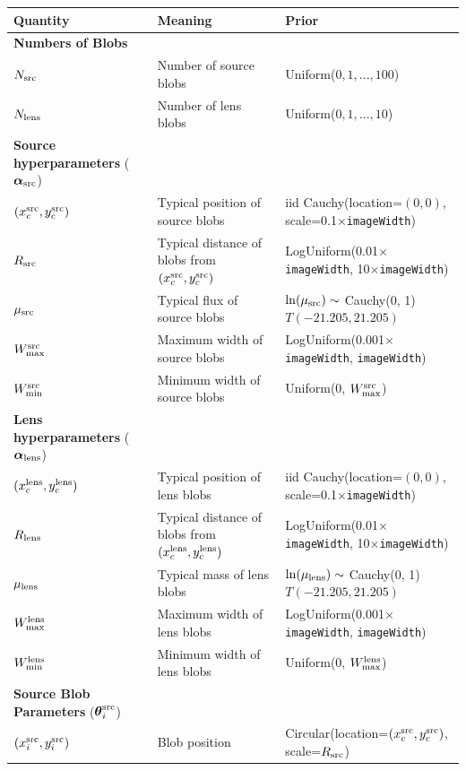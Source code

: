 \documentclass[useAMS,usenatbib]{mn2e}
\begin{document}
\begin{table}
\begin{tabular}{|l|l|l|}
\hline
Quantity	&	Meaning		& Prior\\
\hline
{\bf Numbers of Blobs}\\
\hline
$N_{\rm src}$	&	Number of source blobs	& Uniform($0, 1, ..., 100$)\\
$N_{\rm lens}$	&	Number of lens blobs	& Uniform($0, 1, ..., 10$)\\
\hline
{\bf Source hyperparameters} ($\boldsymbol{\alpha}_{\rm src}$)\\
\hline
$(x_c^{\rm src}, y_c^{\rm src})$ & Typical position of source blobs & iid Cauchy(location=$(0,0)$, scale=0.1$\times${\tt imageWidth})\\
$R_{\rm src}$   &	Typical distance of blobs from $(x_c^{\rm src}, y_c^{\rm src})$ & LogUniform(0.01$\times${\tt imageWidth}, 10$\times${\tt imageWidth})\\
$\mu_{\rm src}$ &	Typical flux of source blobs	& $\ln(\mu_{\rm src}) \sim$ Cauchy(0, 1)$T(-21.205, 21.205)$\\
$W_{\rm max}^{\rm src}$ &		Maximum width of source blobs	& LogUniform(0.001$\times${\tt imageWidth}, {\tt imageWidth})\\
$W_{\rm min}^{\rm src}$ &		Minimum width of source blobs	& Uniform(0, $W_{\rm max}^{\rm src}$)\\
\hline
{\bf Lens hyperparameters} ($\boldsymbol{\alpha}_{\rm lens}$)\\
\hline
$(x_c^{\rm lens}, y_c^{\rm lens})$ & Typical position of lens blobs & iid Cauchy(location=$(0,0)$, scale=0.1$\times${\tt imageWidth})\\
$R_{\rm lens}$  &	Typical distance of blobs from $(x_c^{\rm lens}, y_c^{\rm lens})$ 	& LogUniform(0.01$\times${\tt imageWidth}, 10$\times${\tt imageWidth})\\
$\mu_{\rm lens}$&	Typical mass of lens blobs	& $\ln(\mu_{\rm lens}) \sim$ Cauchy(0, 1)$T(-21.205, 21.205)$\\
$W_{\rm max}^{\rm lens}$ &		Maximum width of lens blobs	& LogUniform(0.001$\times${\tt imageWidth}, {\tt imageWidth})\\
$W_{\rm min}^{\rm lens}$ &		Minimum width of lens blobs	& Uniform(0, $W_{\rm max}^{\rm lens}$)\\
\hline
{\bf Source Blob Parameters} ($\boldsymbol{\theta}_i^{\rm src}$)\\
\hline
$(x_i^{\rm src}, y_i^{\rm src})$ & Blob position & Circular(location=$(x_c^{\rm src}, y_c^{\rm src})$, scale=$R_{\rm src}$)\\

\end{tabular}
\end{table}
\end{document}
